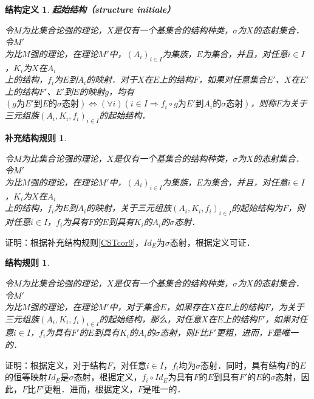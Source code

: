 \documentclass[12pt, a4paper, oneside]{book}
\newtheorem{STdef}{结构定义}
\newtheorem{CST}{结构规则}
\newtheorem{CSTcor}{补充结构规则}
\begin{document}
			\begin{STdef}
				\textbf{起始结构（structure initiale）}
				\par
				令$M$为比集合论强的理论，$X$是仅有一个基集合的结构种类，$\sigma$为$X$的态射集合．令$M'$\\为比$M$强的理论，在理论$M'$中，$(A_i)_{i\in I}$为集族，$E$为集合，并且，对任意$i\in I$，$K_i$为$X$在$A_i$\\上的结构，$f_i$为$E$到$A_i$的映射．对于$X$在$E$上的结构$F$，如果对任意集合$E'$、$X$在$E'$上的结构$F'$、$E'$到$E$的映射$g$，均有$(g\text{为}E'\text{到}E\text{的}\sigma\text{态射})\Leftrightarrow (\forall i)(i\in I\Rightarrow f_i\circ g\text{为}E'\text{到}A_i\text{的}\sigma\text{态射})$，则称$F$为关于三元组族$(A_i, K_i, f_i)_{i\in I}$的起始结构．
			\end{STdef}
			
			\begin{CSTcor}\label{CSTcor11}
				\hfill\par
				令$M$为比集合论强的理论，$X$是仅有一个基集合的结构种类，$\sigma$为$X$的态射集合．令$M'$\\为比$M$强的理论，在理论$M'$中，$(A_i)_{i\in I}$为集族，$E$为集合，并且，对任意$i\in I$，$K_i$为$X$在$A_i$\\上的结构，$f_i$为$E$到$A_i$的映射，关于三元组族$(A_i, K_i, f_i)_{i\in I}$的起始结构为$F$，则对任意$i\in I$，$f_i$为具有$F$的$E$到具有$K_i$的$A_i$的$\sigma$态射．
			\end{CSTcor}
			证明：根据补充结构规则\ref{CSTcor9}，$Id_E$为$\sigma$态射，根据定义可证．
			
			\begin{CST}\label{CST9}
				\hfill\par
				令$M$为比集合论强的理论，$X$是仅有一个基集合的结构种类，$\sigma$为$X$的态射集合．令$M'$\\为比$M$强的理论，在理论$M'$中，对于集合$E$，如果存在$X$在$E$上的结构$F$，为关于三元组族$(A_i, K_i, f_i)_{i\in I}$的起始结构，那么，对任意$X$在$E$上的结构$F'$，如果对任意$i\in I$，$f_i$为具有$F'$的$E$到具有$K_i$的$A_i$的$\sigma$态射，则$F$比$F'$更粗，进而，$F$是唯一的．
			\end{CST}
			证明：根据定义，对于结构$F$，对任意$i\in I$，$f_i$均为$\sigma$态射．同时，具有结构$F$的$E$的恒等映射$Id_E$是$\sigma$态射，根据定义，$f_i\circ Id_E$为具有$F$的$E$到具有$F'$的$E$的$\sigma$态射，因此，$F$比$F'$更粗．进而，根据定义，$F$是唯一的．
			
\end{document}
